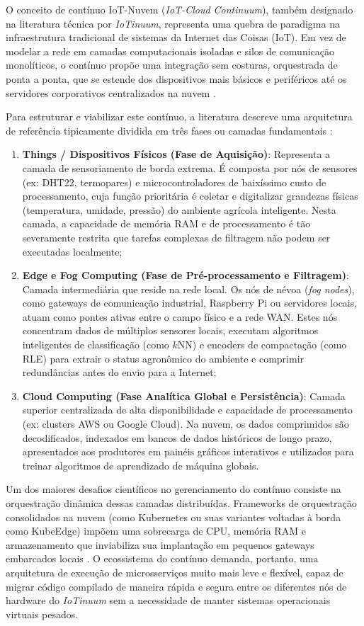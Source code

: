 \documentclass[
	12pt,
	openright,
	oneside,
	a4paper,
	english,
	brazil
	]{abntex2}
\begin{document}
O conceito de contínuo IoT-Nuvem (\textit{IoT-Cloud Continuum}), também designado na literatura técnica por \textit{IoTinuum}, representa uma quebra de paradigma na infraestrutura tradicional de sistemas da Internet das Coisas (IoT). Em vez de modelar a rede em camadas computacionais isoladas e silos de comunicação monolíticos, o contínuo propõe uma integração sem costuras, orquestrada de ponta a ponta, que se estende dos dispositivos mais básicos e periféricos até os servidores corporativos centralizados na nuvem \cite{kamienski2017iotinuum}.

Para estruturar e viabilizar este contínuo, a literatura descreve uma arquitetura de referência tipicamente dividida em três fases ou camadas fundamentais \cite{naha2018fog, puliafito2019mobility}:
\begin{enumerate}
    \item \textbf{Things / Dispositivos Físicos (Fase de Aquisição)}: Representa a camada de sensoriamento de borda extrema. É composta por nós de sensores (ex: DHT22, termopares) e microcontroladores de baixíssimo custo de processamento, cuja função prioritária é coletar e digitalizar grandezas físicas (temperatura, umidade, pressão) do ambiente agrícola inteligente. Nesta camada, a capacidade de memória RAM e de processamento é tão severamente restrita que tarefas complexas de filtragem não podem ser executadas localmente;
    \item \textbf{Edge e Fog Computing (Fase de Pré-processamento e Filtragem)}: Camada intermediária que reside na rede local. Os nós de névoa (\textit{fog nodes}), como gateways de comunicação industrial, Raspberry Pi ou servidores locais, atuam como pontes ativas entre o campo físico e a rede WAN. Estes nós concentram dados de múltiplos sensores locais, executam algoritmos inteligentes de classificação (como $k$NN) e encoders de compactação (como RLE) para extrair o status agronômico do ambiente e comprimir redundâncias antes do envio para a Internet;
    \item \textbf{Cloud Computing (Fase Analítica Global e Persistência)}: Camada superior centralizada de alta disponibilidade e capacidade de processamento (ex: clusters AWS ou Google Cloud). Na nuvem, os dados comprimidos são decodificados, indexados em bancos de dados históricos de longo prazo, apresentados aos produtores em painéis gráficos interativos e utilizados para treinar algoritmos de aprendizado de máquina globais.
\end{enumerate}

Um dos maiores desafios científicos no gerenciamento do contínuo consiste na orquestração dinâmica dessas camadas distribuídas. Frameworks de orquestração consolidados na nuvem (como Kubernetes ou suas variantes voltadas à borda como KubeEdge) impõem uma sobrecarga de CPU, memória RAM e armazenamento que inviabiliza sua implantação em pequenos gateways embarcados locais \cite{pfandzelter2021orchestration}. O ecossistema do contínuo demanda, portanto, uma arquitetura de execução de microsserviços muito mais leve e flexível, capaz de migrar código compilado de maneira rápida e segura entre os diferentes nós de hardware do \textit{IoTinuum} sem a necessidade de manter sistemas operacionais virtuais pesados.
\end{document}

